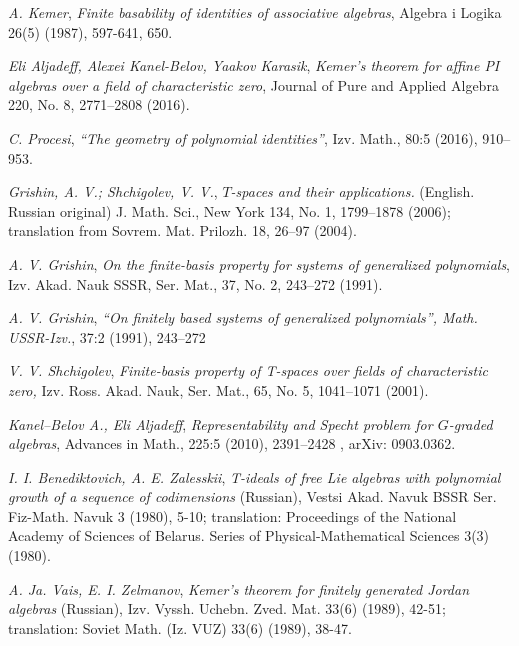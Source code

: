 \documentclass[12pt,a4paper]{article}
\begin{document}
    \begin{thebibliography}{10}

         {\sl A. Kemer}, {\it Finite basability of identities of associative algebras}, Algebra i Logika 26(5) (1987), 597-641, 650.

         {\sl Eli Aljadeff, Alexei Kanel-Belov, Yaakov Karasik}, {\it Kemer’s theorem for affine PI algebras over a field of characteristic zero}, Journal of Pure and Applied Algebra 220, No. 8, 2771--2808 (2016).

         {\sl C. Procesi}, {\it “The geometry of polynomial identities”}, Izv. Math., 80:5 (2016), 910–953.

         {\sl Grishin, A. V.; Shchigolev, V. V.}, {\it $T$-spaces and their applications.} (English. Russian original) J. Math. Sci., New York 134, No. 1, 1799--1878 (2006); translation from Sovrem. Mat. Prilozh. 18, 26--97 (2004).

         {\sl A. V. Grishin}, {\it On the finite-basis property for systems of generalized polynomials}, Izv. Akad. Nauk
        SSSR, Ser. Mat., 37, No. 2, 243–272 (1991).

         {\sl A. V. Grishin}, {\it “On finitely based systems of generalized polynomials”, Math. USSR-Izv.}, 37:2 (1991), 243–272

         {\sl V. V. Shchigolev}, {\it Finite-basis property of T-spaces over fields of characteristic zero,} Izv. Ross.
        Akad. Nauk, Ser. Mat., 65, No. 5, 1041–1071 (2001).

         {\sl Kanel–Belov A., Eli Aljadeff}, {\it Representability and Specht problem for $G$-graded algebras}, Advances in Math., 225:5 (2010), 2391--2428 , arXiv: 0903.0362.


         {\sl I. I. Benediktovich, A. E. Zalesskii}, {\it T-ideals of free Lie algebras with polynomial growth of a sequence of codimensions} (Russian), Vestsi Akad. Navuk BSSR Ser. Fiz-Math. Navuk 3 (1980), 5-10; translation: Proceedings of the National
        Academy of Sciences of Belarus. Series of Physical-Mathematical Sciences 3(3) (1980).

         {\sl A. Ja. Vais, E. I. Zelmanov}, {\it Kemer’s theorem for finitely generated Jordan algebras} (Russian), Izv. Vyssh. Uchebn. Zved.
        Mat. 33(6) (1989), 42-51; translation: Soviet Math. (Iz. VUZ) 33(6) (1989), 38-47.


\end{thebibliography}
\end{document}
